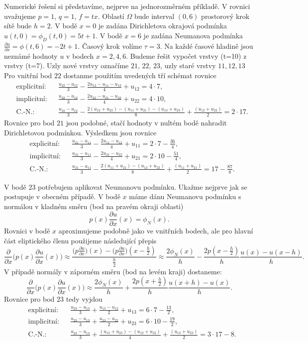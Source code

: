 \documentclass[a4paper,10pt]{article}
\def\prtl{\partial}                                        %
\begin{document}
Numerické řešení si představíme, nejprve na jednorozměrném příkladě. V rovnici uvažujeme
$p=1$, $q=1$, $f=tx$. Oblastí $\Omega$ bude interval
$(0,6)$ prostorový krok sítě bude $h=2$. V bodě $x=0$ je zadána Dirichletova okrajová podmínka $u(t,0)=\phi_D(t,0)=5t+1$.
V bodě $x=6$ je zadána Neumanova podmínka $\frac{\prtl u}{\prtl x}=\phi(t,6)=-2t+1$. 
Časový krok volíme $\tau=3$. Na každé časové hladině jsou neznámé hodnoty $u$ v bodech $x=2,4,6$.
Budeme řešit vypočet vrstvy (t=10) z vrstvy (t=7). Uzly nové vrstvy označíme $21$, $22$, $23$, uzly staré vrstvy $11,12,13$
Pro vnitřní bod $22$ dostanme použitím uvedených tří schémat rovnice
\begin{align}
 &\text{explicitní:}&& \frac{u_{22}-u_{12}}{3}-\frac{2u_{12}-u_{11}-u_{13}}{4}+u_{12}=4\cdot7,\\
 &\text{implicitní:}&& \frac{u_{22}-u_{12}}{3}-\frac{2u_{22}-u_{21}-u_{23}}{4}+u_{22}=4\cdot10,\\
 &\text{C.-N.:}&& \frac{u_{22}-u_{12}}{3}-\frac{2(u_{12}+u_{22})-(u_{11}+u_{21})-(u_{13}+u_{23})}{8}
  +\frac{(u_{12}+u_{22})}{2}=2\cdot17.
\end{align}
Rovnice pro bod $21$ jsou podobné, stačí hodnoty v nultém bodě nahradit Dirichletovou podmínkou. Výsledkem jsou rovnice
\begin{align}
 &\text{explicitní:}&& \frac{u_{21}-u_{11}}{3}-\frac{2u_{11}-u_{12}}{4}+u_{11}=2\cdot7-\frac{36}{4},\\
 &\text{implicitní:}&& \frac{u_{21}-u_{11}}{3}-\frac{2u_{21}-u_{22}}{4}+u_{21}=2\cdot10-\frac{51}{4},\\
 &\text{C.-N.:}&& \frac{u_{21}-u_{11}}{3}-\frac{2(u_{11}+u_{21})-(u_{12}+u_{22})}{8}
  +\frac{(u_{11}+u_{21})}{2}=17-\frac{87}{8}.
\end{align}

V bodě $23$ potřebujem aplikovat Neumanovu podmínku. Ukažme nejprve jak se postupuje v obecném případě. V bodě $x$ máme dánu Neumanovu podmínku s normálou v kladném směru (bod na pravém okraji oblasti)
\[
  p(x)\frac{\prtl u}{\prtl x}(x)=\phi_N(x).
\]
Rovnici v bodě $x$ aproximujeme podobně jako ve vnitřních bodech, ale pro hlavní část eliptického členu použijeme následující přepis 
\[
 \frac{\prtl}{\prtl x}\Big( p(x)\frac{\prtl u}{\prtl x}(x)\Big)\approx 
    \frac{\big(p\frac{\prtl u}{\prtl x}\big)(x)-\big(p\frac{\prtl u}{\prtl x}\big)(x-\frac{h}2)}{\frac{h}{2}}
\approx
   \frac{2\phi_N(x)}{h}-\frac{2p(x-\frac{h}2)}{h}\frac{u(x)-u(x-h)}{h}.
\]
V případě normály v záporném směru (bod na levém kraji) dostaneme:
\[
 \frac{\prtl}{\prtl x}\Big( p(x)\frac{\prtl u}{\prtl x}(x)\Big)\approx 
   \frac{2\phi_N(x)}{h}+\frac{2p(x+\frac{h}2)}{h}\frac{u(x+h)-u(x)}{h}.
\]
Rovnice pro bod $23$ tedy vyjdou
\begin{align}
 &\text{explicitní:}&& \frac{u_{23}-u_{13}}{3}+\frac{u_{13}-u_{12}}{2}+u_{13}=6\cdot7-\frac{13}{2},\\
 &\text{implicitní:}&& \frac{u_{23}-u_{13}}{3}+\frac{u_{23}-u_{22}}{2}+u_{23}=6\cdot10-\frac{19}{2},\\
 &\text{C.-N.:}&& \frac{u_{23}-u_{13}}{3}+\frac{(u_{13}+u_{23})-(u_{12}+u_{22})}{4}
  +\frac{(u_{13}+u_{23})}{2}=3\cdot17-8.
\end{align}
\end{document}
